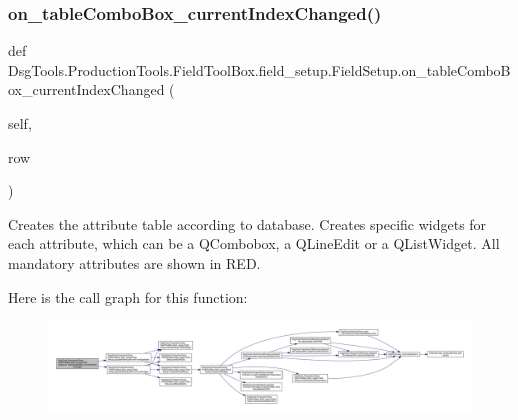 \subsubsection{\texorpdfstring{on\+\_\+table\+Combo\+Box\+\_\+current\+Index\+Changed()}{on\_tableComboBox\_currentIndexChanged()}}
{\footnotesize\ttfamily def Dsg\+Tools.\+Production\+Tools.\+Field\+Tool\+Box.\+field\+\_\+setup.\+Field\+Setup.\+on\+\_\+table\+Combo\+Box\+\_\+current\+Index\+Changed (\begin{DoxyParamCaption}\item[{}]{self,  }\item[{}]{row }\end{DoxyParamCaption})}

\begin{DoxyVerb}Creates the attribute table according to database.
Creates specific widgets for each attribute, which can be a QCombobox, a QLineEdit or a QListWidget.
All mandatory attributes are shown in RED.
\end{DoxyVerb}
 Here is the call graph for this function\+:
\nopagebreak
\begin{figure}[H]
\begin{center}
\leavevmode
\includegraphics[width=350pt]{class_dsg_tools_1_1_production_tools_1_1_field_tool_box_1_1field__setup_1_1_field_setup_a6e2d8c353c167c84942872b12d46306f_cgraph}
\end{center}
\end{figure}
\mbox{\label{class_dsg_tools_1_1_production_tools_1_1_field_tool_box_1_1field__setup_1_1_field_setup_a102c7b87541e966cd5042cd505fa4f1e}} 
